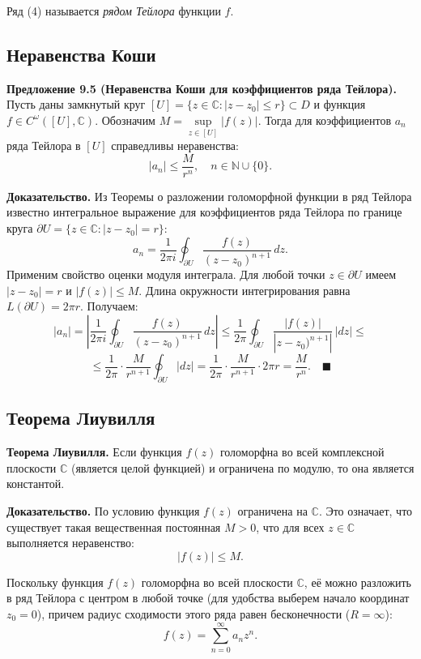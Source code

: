 \documentclass[12pt, a4paper]{article}
\theoremstyle{definition}
\theoremstyle{remark}
\begin{document}
Ряд (4) называется \textit{рядом Тейлора} функции $f$.

\subsection{Неравенства Коши}

\textbf{Предложение 9.5 (Неравенства Коши для коэффициентов ряда Тейлора).} Пусть даны замкнутый круг $[U] = \{z \in \mathbb{C} : |z - z_0| \le r\} \subset D$ и функция $f \in C^{\omega}([U], \mathbb{C})$. Обозначим $M = \sup\limits_{z \in [U]} |f(z)|$. Тогда для коэффициентов $a_n$ ряда Тейлора в $[U]$ справедливы неравенства:
\begin{equation}
	|a_n| \le \frac{M}{r^n}, \quad n \in \mathbb{N} \cup \{0\}.
\end{equation}

\textbf{Доказательство.} Из Теоремы о разложении голоморфной функции в ряд Тейлора известно интегральное выражение для коэффициентов ряда Тейлора по границе круга $\partial U = \{z \in \mathbb{C} : |z - z_0| = r\}$:
\[
a_n = \frac{1}{2\pi i} \oint_{\partial U} \frac{f(z)}{(z - z_0)^{n+1}} \, dz.
\]
Применим свойство оценки модуля интеграла. Для любой точки $z \in \partial U$ имеем $|z - z_0| = r$ и $|f(z)| \le M$. Длина окружности интегрирования равна $L(\partial U) = 2\pi r$. Получаем:
\[
|a_n| = \left| \frac{1}{2\pi i} \oint_{\partial U} \frac{f(z)}{(z - z_0)^{n+1}} \, dz \right| \le \frac{1}{2\pi} \oint_{\partial U} \frac{|f(z)|}{|z - z_0)^{n+1}|} \, |dz| \le
\]
\[
\le \frac{1}{2\pi} \cdot \frac{M}{r^{n+1}} \oint_{\partial U} |dz| = \frac{1}{2\pi} \cdot \frac{M}{r^{n+1}} \cdot 2\pi r = \frac{M}{r^n}. \quad \blacksquare
\]

\subsection{Теорема Лиувилля}

\textbf{Теорема Лиувилля.} Если функция $f(z)$ голоморфна во всей комплексной плоскости $\mathbb{C}$ (является целой функцией) и ограничена по модулю, то она является константой.

\textbf{Доказательство.} 
По условию функция $f(z)$ ограничена на $\mathbb{C}$. Это означает, что существует такая вещественная постоянная $M > 0$, что для всех $z \in \mathbb{C}$ выполняется неравенство:
\begin{equation}
	|f(z)| \le M.
\end{equation}

Поскольку функция $f(z)$ голоморфна во всей плоскости $\mathbb{C}$, её можно разложить в ряд Тейлора с центром в любой точке (для удобства выберем начало координат $z_0 = 0$), причем радиус сходимости этого ряда равен бесконечности ($R = \infty$):
\[
f(z) = \sum_{n=0}^{\infty} a_n z^n.
\]
\end{document}
